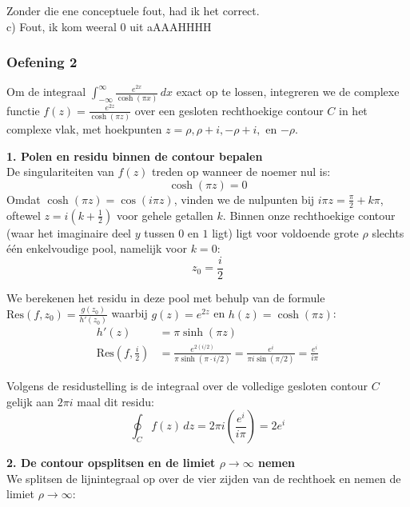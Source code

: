 \documentclass[a4paper,twoside]{article}
\theoremstyle{definition}
\theoremstyle{plain}
\begin{document}
Zonder die ene conceptuele fout, had ik het correct.\\
c) Fout, ik kom weeral 0 uit aAAAHHHH\\

\subsubsection{Oefening 2}

Om de integraal $\displaystyle \int_{-\infty}^{\infty} \frac{e^{2x}}{\cosh(\pi x)} \, dx$ exact op te lossen, integreren we de complexe functie $f(z) = \frac{e^{2z}}{\cosh(\pi z)}$ over een gesloten rechthoekige contour $C$ in het complexe vlak, met hoekpunten $z = \rho, \rho + i, -\rho + i,$ en $-\rho$.

\vspace{0.3cm}
\noindent \textbf{1. Polen en residu binnen de contour bepalen} \\
De singulariteiten van $f(z)$ treden op wanneer de noemer nul is:
\[ \cosh(\pi z) = 0 \]
Omdat $\cosh(\pi z) = \cos(i\pi z)$, vinden we de nulpunten bij $i\pi z = \frac{\pi}{2} + k\pi$, oftewel $z = i\left(k + \frac{1}{2}\right)$ voor gehele getallen $k$. Binnen onze rechthoekige contour (waar het imaginaire deel $y$ tussen $0$ en $1$ ligt) ligt voor voldoende grote $\rho$ slechts één enkelvoudige pool, namelijk voor $k=0$:
\[ z_0 = \frac{i}{2} \]

\noindent We berekenen het residu in deze pool met behulp van de formule $\text{Res}(f, z_0) = \frac{g(z_0)}{h'(z_0)}$ waarbij $g(z) = e^{2z}$ en $h(z) = \cosh(\pi z)$:
\begin{align*}
    h'(z) &= \pi \sinh(\pi z) \\
    \text{Res}\left(f, \frac{i}{2}\right) &= \frac{e^{2(i/2)}}{\pi \sinh(\pi \cdot i/2)} = \frac{e^i}{\pi i \sin(\pi/2)} = \frac{e^i}{i\pi}
\end{align*}

\noindent Volgens de residustelling is de integraal over de volledige gesloten contour $C$ gelijk aan $2\pi i$ maal dit residu:
\[ \oint_C f(z) \, dz = 2\pi i \left( \frac{e^i}{i\pi} \right) = 2e^i \]

\vspace{0.3cm}
\noindent \textbf{2. De contour opsplitsen en de limiet $\rho \to \infty$ nemen} \\
We splitsen de lijnintegraal op over de vier zijden van de rechthoek en nemen de limiet $\rho \to \infty$:
\end{document}

